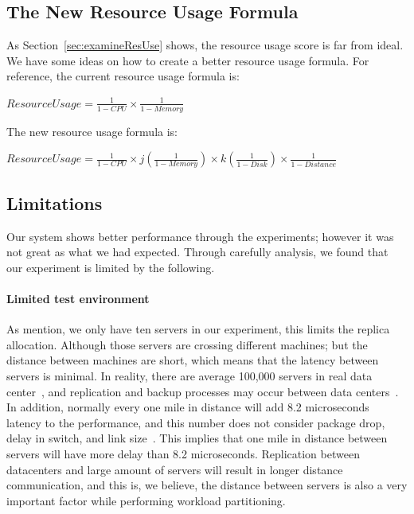 \subsection{The New Resource Usage Formula}
As Section~\ref{sec:examineResUse} shows, the resource usage score is far from ideal. We have some ideas on how to create a better resource usage formula. For reference, the current resource usage formula is:

\begin{center}
$ResourceUsage = \frac{1}{1-CPU} \times \frac{1}{1-Memory}$
\end{center}

The new resource usage formula is:
\begin{center}
$ResourceUsage = \frac{1}{1-CPU} \times j\left ( \frac{1}{1-Memory} \right ) \times k\left ( \frac{1}{1-Disk} \right ) \times \frac{1}{1-Distance}$
\end{center}



\subsection{Limitations}
    	Our system shows better performance through the experiments; however it was not great as what we had expected. Through carefully analysis, we found that our experiment is limited by the following.

\paragraph{Limited test environment}
As mention, we only have ten servers in our experiment, this limits the replica allocation. Although those servers are crossing different machines; but the distance between machines are short, which means that the latency between servers is minimal. In reality, there are average 100,000 servers in real data center~\cite{Guo:2010:SDC:1921168.1921188}, and replication and backup processes may occur between data centers~\cite{F5-Accelerate}. In addition, normally every one mile in distance will add 8.2 microseconds latency to the performance, and this number does not consider package drop, delay in switch, and link size~\cite{Cisco-Latency}. This implies that one mile in distance between servers will have more delay than 8.2 microseconds. Replication between datacenters and large amount of servers will result in longer distance communication, and this is, we believe, the distance between servers is also a very important factor while performing workload partitioning.
 
